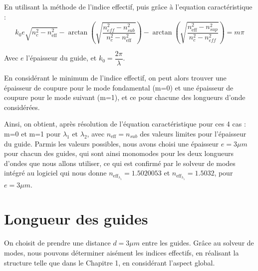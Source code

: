 \documentclass[a4paper,11pt]{report}
\begin{document}
En utilisant la méthode de l'indice effectif, puis grâce à l'equation caractéristique :
\begin{equation}
    k_0e\sqrt{n_c^2-n_{\text{eff}}^2}-\arctan\left(\sqrt{\dfrac{n_{eff}^2-n_{sub}^2}{n_{c}^2-n_{\text{eff}}^2}}\right)-\arctan\left(\sqrt{\dfrac{n_{\text{eff}}^2-n_{sup}^2}{n_{c}^2-n_{eff}^2}}\right)=m\pi
\end{equation}

Avec $e$ l'épaisseur du guide, et $k_0=\dfrac{2\pi}{\lambda}$.

En considérant le minimum de l'indice effectif, on peut alors trouver une épaisseur de coupure pour le mode fondamental (m=0) et une épaisseur de coupure pour le mode suivant (m=1), et ce pour chacune des longueurs d'onde considérées.

Ainsi, on obtient, après résolution de l'équation caractéristique pour ces 4 cas : m=0 et m=1 pour $\lambda_1$ et $\lambda_2$, avec $n_{\text{eff}}=n_{sub}$ des valeurs limites pour l'épaisseur du guide. Parmis les valeurs possibles, nous avons choisi une épaisseur $e=3\mu m$ pour chacun des guides, qui sont ainsi monomodes pour les deux longueurs d'ondes que nous allons utiliser, ce qui est confirmé par le solveur de modes intégré au logiciel qui nous donne $n_{\text{eff}_{\lambda_1}}=1.5020053$ et $n_{\text{eff}_{\lambda_1}}=1.5032$, pour $e=3\mu m$.

\section{Longueur des guides}
On choisit de prendre une distance $d=3\mu m$ entre les guides. Grâce au solveur de modes, nous pouvons déterminer aisément les indices effectifs, en réalisant la structure telle que dans le Chapitre 1, en considérant l'aspect global.

\end{document}
